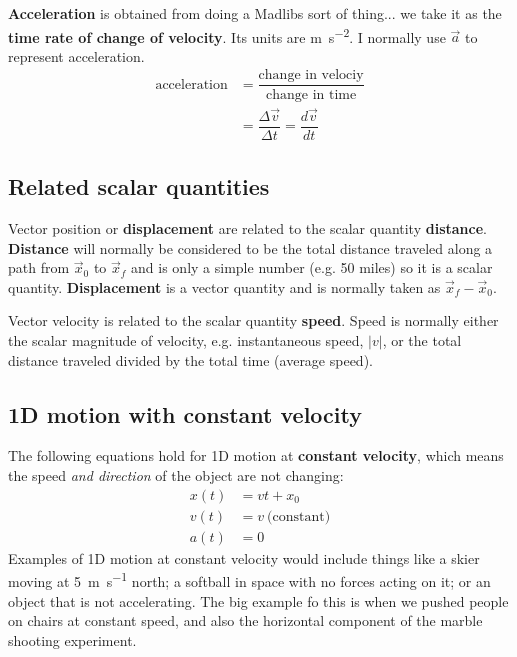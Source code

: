 \documentclass [handout]{tufte-handout}
\begin{document}
\textbf{Acceleration} is obtained from doing a Madlibs sort of thing... we take it as the \textbf{time rate of change of velocity}. Its units are \si{\meter\per\second\squared}. I normally use $\vec{a}$ to represent acceleration. 
\begin{align}
\text{acceleration} &= \dfrac{\text{change in velociy}}{\text{change in time}} \\
&= \dfrac{\Delta \vec{v}}{\Delta t} = \dfrac{d\vec{v}}{dt} 
\end{align}

\subsection{Related scalar quantities}
Vector position or \textbf{displacement} are related to the scalar quantity \textbf{distance}.  \textbf{Distance} will normally be considered to be the total distance traveled along a path from $\vec{x}_0$ to $\vec{x}_f$ and is only a simple number (e.g. 50 miles) so it is a scalar quantity.  \textbf{Displacement} is a vector quantity and is normally taken as $\vec{x}_f - \vec{x}_0$. 

Vector velocity is related to the scalar quantity \textbf{speed}. Speed is normally either the scalar magnitude of velocity, e.g. instantaneous speed, $|v|$, or the total distance traveled divided by the total time (average speed). 

\subsection{1D motion with constant velocity}
The following equations hold for 1D motion at \textbf{constant velocity}, which means the speed \emph{and direction} of the object are not changing:
\begin{align}
x(t) &= v t + x_0 \\
v(t) &= v\ \text{(constant)} \\
a(t) &= 0
\end{align}
Examples of 1D motion at constant velocity would include things like a skier moving at \SI{5}{\meter\per\second} north; a softball in space with no forces acting on it; or an object that is not accelerating. The big example fo this is when we pushed people on chairs at constant speed, and also the horizontal component of the marble shooting experiment. 
\end{document}
